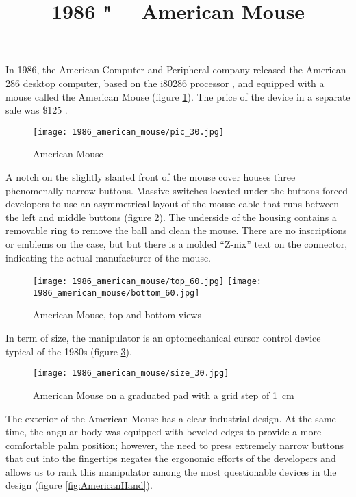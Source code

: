 \documentclass[11pt, a4paper]{article}
\begin{document}
\title{1986 "--- American Mouse}
\date{}
\maketitle
{}
In 1986, the American Computer and Peripheral company released the American 286 desktop computer, based on the i80286 processor \cite{adv}, and equipped with a mouse called the American Mouse (figure \ref{fig:AmericanPic}). The price of the device in a separate sale was \$125 \cite{review}.

\begin{figure}[h]
    \centering
    \texttt{[image: 1986\_american\_mouse/pic\_30.jpg]}
    \caption{American Mouse}
    \label{fig:AmericanPic}
\end{figure}

A notch on the slightly slanted front of the mouse cover houses three phenomenally narrow buttons. Massive switches located under the buttons forced developers to use an asymmetrical layout of the mouse cable that runs between the left and middle buttons (figure \ref{AmericanTopAndBottom}). The underside of the housing contains a removable ring to remove the ball and clean the mouse. There are no inscriptions or emblems on the case, but but there is a molded ``Z-nix'' text on the connector, indicating the actual manufacturer of the mouse.

\begin{figure}[h]
    \centering
    \texttt{[image: 1986\_american\_mouse/top\_60.jpg]}
    \texttt{[image: 1986\_american\_mouse/bottom\_60.jpg]}
    \caption{American Mouse, top and bottom views}
    \label{AmericanTopAndBottom}
\end{figure}

In term of size, the manipulator is an optomechanical cursor control device typical of the 1980s (figure \ref{fig:AmericanSize}).

\begin{figure}[h]
    \centering
    \texttt{[image: 1986\_american\_mouse/size\_30.jpg]}
    \caption{American Mouse on a graduated pad with a grid step of 1~cm}
    \label{fig:AmericanSize}
\end{figure}

The exterior of the American Mouse has a clear industrial design. At the same time, the angular body was equipped with beveled edges to provide a more comfortable palm position; however, the need to press extremely narrow buttons that cut into the fingertips negates the ergonomic efforts of the developers and allows us to rank this manipulator among the most questionable devices in the design (figure \ref{fig:AmericanHand}).
\end{document}
